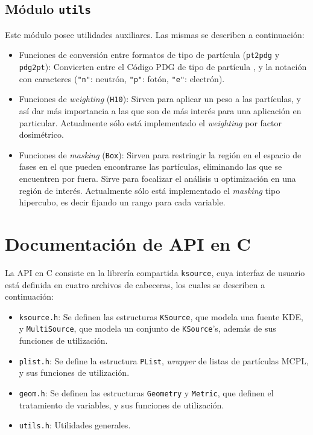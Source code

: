 \subsection{Módulo \texttt{utils}}

Este módulo posee utilidades auxiliares. Las mismas se describen a continuación:
\begin{itemize}
	\item Funciones de conversión entre formatos de tipo de partícula (\verb|pt2pdg| y \verb|pdg2pt|): Convierten entre el Código PDG de tipo de partícula \cite{PDG}, y la notación con caracteres (\verb|"n"|: neutrón, \verb|"p"|: fotón, \verb|"e"|: electrón).
	\item Funciones de \emph{weighting} (\verb|H10|): Sirven para aplicar un peso a las partículas, y así dar más importancia a las que son de más interés para una aplicación en particular. Actualmente sólo está implementado el \emph{weighting} por factor dosimétrico.
	\item Funciones de \emph{masking} (\verb|Box|): Sirven para restringir la región en el espacio de fases en el que pueden encontrarse las partículas, eliminando las que se encuentren por fuera. Sirve para focalizar el análisis u optimización en una región de interés. Actualmente sólo está implementado el \emph{masking} tipo hipercubo, es decir fijando un rango para cada variable.
\end{itemize}



\section{Documentación de API en C}
\label{ap:C}

La API en C consiste en la librería compartida \verb|ksource|, cuya interfaz de usuario está definida en cuatro archivos de cabeceras, los cuales se describen a continuación:
\begin{itemize}
	\item \verb|ksource.h|: Se definen las estructuras \verb|KSource|, que modela una fuente KDE, y \verb|MultiSource|, que modela un conjunto de \verb|KSource|'s, además de sus funciones de utilización.
	\item \verb|plist.h|: Se define la estructura \verb|PList|, \emph{wrapper} de listas de partículas MCPL, y sus funciones de utilización.
	\item \verb|geom.h|: Se definen las estructuras \verb|Geometry| y \verb|Metric|, que definen el tratamiento de variables, y sus funciones de utilización.
	\item \verb|utils.h|: Utilidades generales.
\end{itemize}

